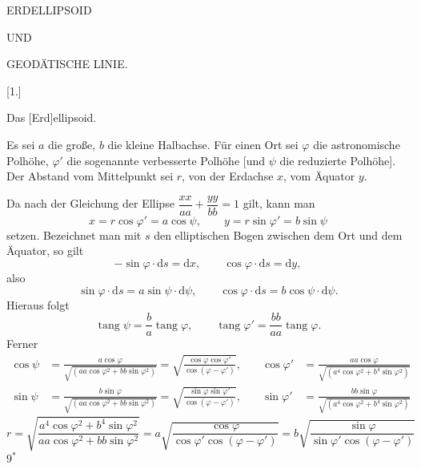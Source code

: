 \clearpage
\vspace*{45mm}
\begin{center}
{\Huge ERDELLIPSOID}\par\vspace{10mm}
{\large UND}\par\vspace{10mm}
{\Huge GEODÄTISCHE LINIE.}
\end{center}
\clearpage
\null
\clearpage
\begin{center}
{\Large{}}\par\vspace{12mm}
[1.]\par
Das [Erd]ellipsoid.
\end{center}
Es sei $a$ die große, $b$ die kleine Halbachse. Für einen Ort sei $\varphi$ die astronomische
Polhöhe, $\varphi'$ die sogenannte verbesserte Polhöhe [und $\psi$ die reduzierte Polhöhe].
Der Abstand vom Mittelpunkt sei $r$, von der Erdachse $x$, vom Äquator $y$.

Da nach der Gleichung der Ellipse $\dfrac{xx}{aa}+\dfrac{yy}{bb}=1$ gilt, kann man
\[
x=r\cos\varphi'=a\cos\psi,\qquad y=r\sin\varphi'=b\sin\psi
\]
setzen. Bezeichnet man mit $s$ den elliptischen Bogen zwischen dem Ort und dem Äquator, so gilt
\[
-\sin\varphi\cdot\mathrm ds=\mathrm dx,\qquad\cos\varphi\cdot\mathrm ds=\mathrm dy,
\]
also
\[
\sin\varphi\cdot\mathrm ds=a\sin\psi\cdot\mathrm d\psi,\qquad\cos\varphi\cdot\mathrm ds=b\cos\psi\cdot\mathrm d\psi.
\]
Hieraus folgt
\[
\operatorname{tang}\psi=\frac ba\operatorname{tang}\varphi,\qquad\operatorname{tang}\varphi'=\frac{bb}{aa}\operatorname{tang}\varphi.
\]
Ferner
\[
\begin{aligned}
\cos\psi&=\frac{a\cos\varphi}{\sqrt{(aa\cos\varphi^2+bb\sin\varphi^2)}}=\sqrt{\frac{\cos\varphi\cos\varphi'}{\cos(\varphi-\varphi')}},\quad&\cos\varphi'&=\frac{aa\cos\varphi}{\sqrt{(a^4\cos\varphi^2+b^4\sin\varphi^2)}}\\
\sin\psi&=\frac{b\sin\varphi}{\sqrt{(aa\cos\varphi^2+bb\sin\varphi^2)}}=\sqrt{\frac{\sin\varphi\sin\varphi'}{\cos(\varphi-\varphi')}},&\sin\varphi'&=\frac{bb\sin\varphi}{\sqrt{(a^4\cos\varphi^2+b^4\sin\varphi^2)}}
\end{aligned}
\]
\[
r=\sqrt{\frac{a^4\cos\varphi^2+b^4\sin\varphi^2}{aa\cos\varphi^2+bb\sin\varphi^2}}=a\sqrt{\frac{\cos\varphi}{\cos\varphi'\cos(\varphi-\varphi')}}=b\sqrt{\frac{\sin\varphi}{\sin\varphi'\cos(\varphi-\varphi')}}
\]
\noindent\hfill $9^*$\par

